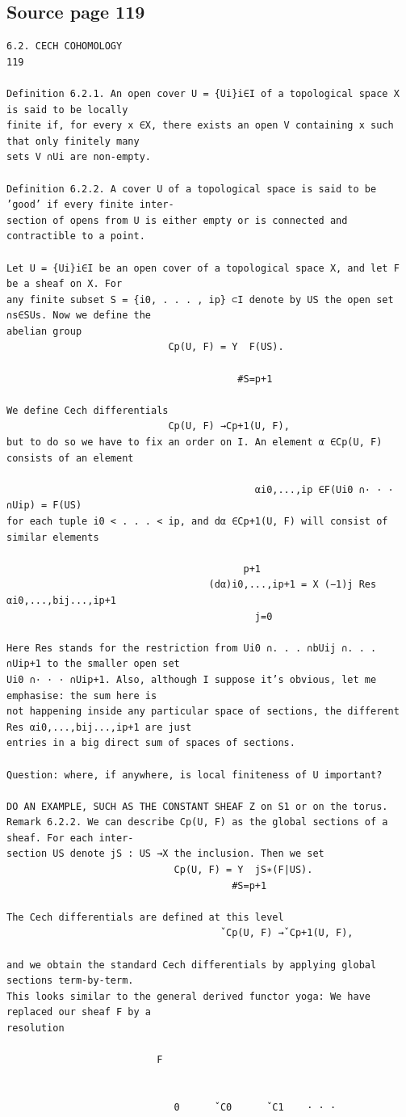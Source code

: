 \subsection*{Source page 119}
\begin{Verbatim}[fontsize=\small]
6.2. CECH COHOMOLOGY                                                   119

Definition 6.2.1. An open cover U = {Ui}i∈I of a topological space X is said to be locally
finite if, for every x ∈X, there exists an open V containing x such that only finitely many
sets V ∩Ui are non-empty.

Definition 6.2.2. A cover U of a topological space is said to be ’good’ if every finite inter-
section of opens from U is either empty or is connected and contractible to a point.

Let U = {Ui}i∈I be an open cover of a topological space X, and let F be a sheaf on X. For
any finite subset S = {i0, . . . , ip} ⊂I denote by US the open set ∩s∈SUs. Now we define the
abelian group
                            Cp(U, F) = Y  F(US).

                                        #S=p+1

We define Cech differentials
                            Cp(U, F) →Cp+1(U, F),
but to do so we have to fix an order on I. An element α ∈Cp(U, F) consists of an element

                                           αi0,...,ip ∈F(Ui0 ∩· · · ∩Uip) = F(US)
for each tuple i0 < . . . < ip, and dα ∈Cp+1(U, F) will consist of similar elements

                                         p+1
                                   (dα)i0,...,ip+1 = X (−1)j Res αi0,...,bij...,ip+1
                                           j=0

Here Res stands for the restriction from Ui0 ∩. . . ∩bUij ∩. . . ∩Uip+1 to the smaller open set
Ui0 ∩· · · ∩Uip+1. Also, although I suppose it’s obvious, let me emphasise: the sum here is
not happening inside any particular space of sections, the different Res αi0,...,bij...,ip+1 are just
entries in a big direct sum of spaces of sections.

Question: where, if anywhere, is local finiteness of U important?

DO AN EXAMPLE, SUCH AS THE CONSTANT SHEAF Z on S1 or on the torus.
Remark 6.2.2. We can describe Cp(U, F) as the global sections of a sheaf. For each inter-
section US denote jS : US →X the inclusion. Then we set
                             Cp(U, F) = Y  jS∗(F|US).
                                       #S=p+1

The Cech differentials are defined at this level
                                     ˇCp(U, F) →ˇCp+1(U, F),

and we obtain the standard Cech differentials by applying global sections term-by-term.
This looks similar to the general derived functor yoga: We have replaced our sheaf F by a
resolution

                          F


                             0      ˇC0      ˇC1    · · ·
\end{Verbatim}

